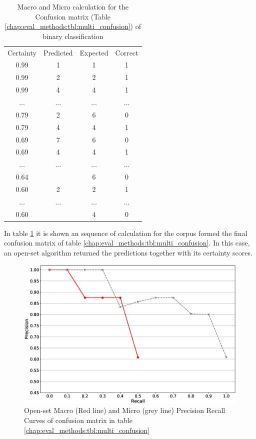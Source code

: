 \begin{table}[H]
	\center
	\caption{Macro and Micro calculation for the Confusion matrix (Table \ref{chap:eval_methods:tbl:multi_confusion}) of binary classification}\label{chap:eval_methods:tbl:prc}
	\begin{tabular}{|c|c|c|c|}
		\cline{1-4}
		Certainty & Predicted & Expected & Correct\\
		\cline{1-4}
		0.99 & 1 & 1 & 1 \\
		0.99 & 2 & 2 & 1 \\
		0.99 & 4 & 4 & 1 \\
		... & ... & ... & ... \\
		0.79 & 2 & 6 & 0 \\
		0.79 & 4 & 4 & 1 \\
		0.69 & 7 & 6 & 0 \\
		0.69 & 4 & 4 & 1 \\
		... & ... & ... & ... \\
		0.64 & \emptyset & 6 & 0 \\
		0.60 & 2 & 2 & 1 \\
		... & ... & ... & ... \\
		0.60 & \emptyset & 4 & 0 \\
		\cline{1-4}
	\end{tabular}
\end{table}

In table \ref{chap:eval_methods:tbl:prc} it is shown an sequence of calculation for the corpus formed the final confusion matrix of table \ref{chap:eval_methods:tbl:multi_confusion}. In this case, an open-set algorithm returned the predictions together with its certainty scores. 

\begin{figure}[t]
	\begin{center}
    	\includegraphics[scale=0.45]{Figures/pr_macro_micro_example.eps}
		\caption{Open-set Macro (Red line) and Micro (grey line) Precision Recall Curves of confusion matrix in table \ref{chap:eval_methods:tbl:multi_confusion}}
		\label{chap:eval_methods:fig:prc_macro}
	\end{center}
\end{figure}

